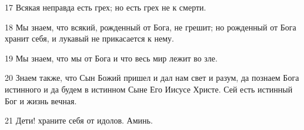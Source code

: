 \par 17 Всякая неправда есть грех; но есть грех не к смерти.
\par 18 Мы знаем, что всякий, рожденный от Бога, не грешит; но рожденный от Бога хранит себя, и лукавый не прикасается к нему.
\par 19 Мы знаем, что мы от Бога и что весь мир лежит во зле.
\par 20 Знаем также, что Сын Божий пришел и дал нам свет и разум, да познаем Бога истинного и да будем в истинном Сыне Его Иисусе Христе. Сей есть истинный Бог и жизнь вечная.
\par 21 Дети! храните себя от идолов. Аминь.


